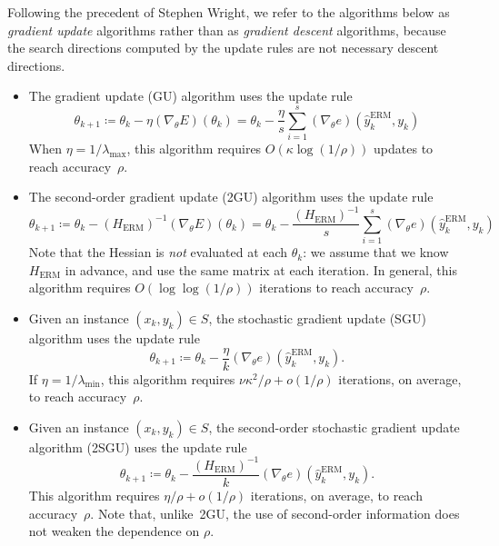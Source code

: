 \documentclass[11pt,a4paper]{article}
\numberwithin{equation}{section}
\begin{document}
Following the precedent of Stephen Wright, we refer to the algorithms below as
\emph{gradient update} algorithms rather than as \emph{gradient descent}
algorithms, because the search directions computed by the update rules are not
necessary descent directions.
\begin{itemize} 
\item The gradient update (GU) algorithm uses the update rule
\[
	\theta_{k + 1}
	\coloneqq \theta_k - \eta (\nabla_\theta E)(\theta_k)
	= \theta_k - \frac{\eta}{s} \sum_{i = 1}^s
		(\nabla_\theta e)(\hat{y}_k^{\text{ERM}}, y_k)
\]
When $\eta = 1/\lambda_{\text{max}}$, this algorithm requires $O(\kappa \log(1 /
\rho))$ updates to reach accuracy~$\rho$.

\item The second-order gradient update (2GU) algorithm uses the update rule
\[
	\theta_{k + 1}
	\coloneqq \theta_k - (H_{\text{ERM}})^{-1} (\nabla_\theta E)(\theta_k)
	= \theta_k - \frac{(H_{\text{ERM}})^{-1}}{s} \sum_{i = 1}^s
		(\nabla_\theta e)(\hat{y}_k^{\text{ERM}}, y_k)
\]
Note that the Hessian is \emph{not} evaluated at each $\theta_k$: we assume that
we know $H_{\text{ERM}}$ in advance, and use the same matrix at each iteration.
In general, this algorithm requires $O(\log\log(1 / \rho))$ iterations to reach
accuracy~$\rho$.

\item Given an instance $(x_k, y_k) \in S$, the stochastic gradient update (SGU)
algorithm uses the update rule
\[
	\theta_{k + 1}
	\coloneqq \theta_k - \frac{\eta}{k}
		(\nabla_\theta e)(\hat{y}_k^{\text{ERM}}, y_k).
\]
If $\eta = 1/\lambda_{\text{min}}$, this algorithm requires $\nu \kappa^2 / \rho
+ o(1 / \rho)$ iterations, on average, to reach accuracy~$\rho$.

\item Given an instance $(x_k, y_k) \in S$, the second-order stochastic gradient
update algorithm (2SGU) uses the update rule
\[
	\theta_{k + 1}
	\coloneqq \theta_k - \frac{(H_{\text{ERM}})^{-1}}{k}
		(\nabla_\theta e)(\hat{y}_k^{\text{ERM}}, y_k).
\]
This algorithm requires $\eta / \rho + o(1 / \rho)$ iterations, on average, to
reach accuracy~$\rho$. Note that, unlike~2GU, the use of second-order
information does not weaken the dependence on $\rho$.
\end{itemize}
\end{document}
